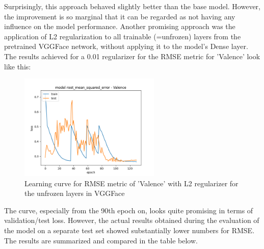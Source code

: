Surprisingly, this approach behaved slightly better than the base model. However, the improvement is so marginal that it can be regarded as not having any influence on the model performance.
\newline\newline
Another promising approach was the application of L2 regularization to all trainable (=unfrozen) layers from the pretrained VGGFace network, without applying it to the model's Dense layer. The results achieved for a 0.01 regularizer for the RMSE metric for 'Valence' look like this:

\begin{figure}[H]
  \begin{center}
  \includegraphics[angle=0, width=0.6\textwidth]{Figures/rmse_out1_L2VGGFace.png}
  \caption{Learning curve for RMSE metric of 'Valence' with L2 regularizer for the unfrozen layers in VGGFace}
  \label{fig:AblationL2VGGFace}
  \end{center}
\end{figure}

The curve, especially from the 90th epoch on, looks quite promising in terms of validation/test loss. However, the actual results obtained during the evaluation of the model on a separate test set showed substantially lower numbers for RMSE. The results are summarized and compared in the table below.

